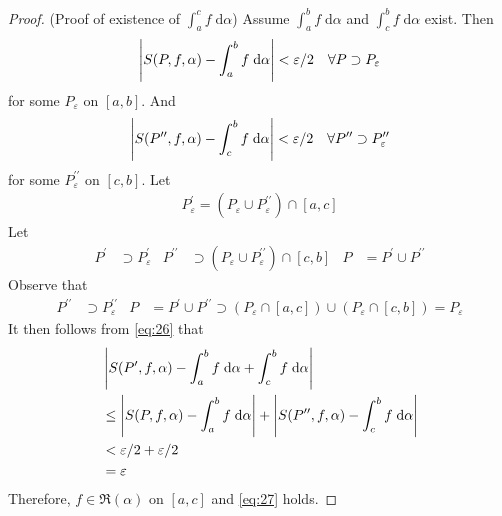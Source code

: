 \documentclass[thmcnt=section, 12pt]{my-elegantbook}
\begin{document}
\begin{proof}
    \par (Proof of existence of $\int_a^c f \; \mathrm{d}\alpha$) Assume $\int_a^b f \; \mathrm{d}\alpha$ and $\int_c^b f \; \mathrm{d}\alpha$ exist. Then 
    \begin{align*}
        \left\lvert S(P, f, \alpha) - \int_a^b f \; \mathrm{d}\alpha \right\rvert < \varepsilon / 2
        \quad \forall P \supset P_\varepsilon
    \end{align*}
    for some $P_\varepsilon$ on $[a, b]$. And
    \begin{align*}
        \left\lvert S(P^{\prime\prime}, f, \alpha) - \int_c^b f \; \mathrm{d}\alpha \right\rvert < \varepsilon / 2
        \quad \forall P^{\prime\prime} \supset P_\varepsilon^{\prime\prime}
    \end{align*}
    for some $P_\varepsilon^{\prime\prime}$ on $[c, b]$.
    Let
    \begin{align*}
        P_\varepsilon^\prime = (P_\varepsilon \cup P_\varepsilon^{\prime\prime}) \cap [a, c]
    \end{align*}
    Let
    \begin{align*}
        P^\prime &\supset P_\varepsilon^\prime &
        P^{\prime\prime} &\supset (P_\varepsilon \cup P_\varepsilon^{\prime\prime}) \cap [c, b] &
        P &= P^\prime \cup P^{\prime\prime}
    \end{align*} 
    Observe that 
    \begin{align*}
        P^{\prime\prime} &\supset P_\varepsilon^{\prime\prime} &
        P &= P^\prime \cup P^{\prime\prime}
        \supset (P_\varepsilon \cap [a, c]) \cup (P_\varepsilon \cap [c, b])
        = P_\varepsilon
    \end{align*}
    It then follows from \eqref{eq:26} that
    \begin{align*}
        &\left\lvert 
            S(P^\prime, f, \alpha)
            - \int_a^b f \; \mathrm{d}\alpha
            + \int_c^b f \; \mathrm{d}\alpha 
         \right\rvert \\ 
        &\leq \left\lvert 
            S(P, f, \alpha)
            - \int_a^b f \; \mathrm{d}\alpha
         \right\rvert + \left\lvert 
            S(P^{\prime\prime}, f, \alpha)
            - \int_c^b f \; \mathrm{d}\alpha
         \right\rvert \\ 
        &< \varepsilon / 2 + \varepsilon / 2 \\ 
        &= \varepsilon
    \end{align*} 
    Therefore, $f \in \mathfrak{R}(\alpha)$ on $[a, c]$ and \eqref{eq:27} holds.

\end{proof}
\end{document}
